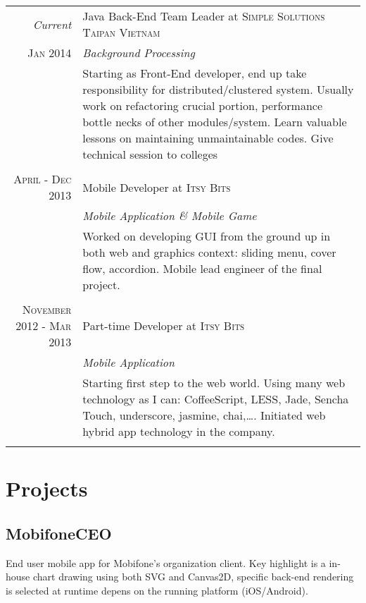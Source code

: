 \documentclass[a4paper,10pt]{article}
\begin{document}
\begin{tabular}{r|p{11cm}}

    \emph{Current} & Java Back-End Team Leader at \textsc{Simple Solutions Taipan Vietnam} \\\textsc{Jan 2014}&\emph{Background Processing}\\&\footnotesize{Starting as Front-End developer, end up take responsibility for distributed/clustered system. Usually work on refactoring crucial portion, performance bottle necks of other modules/system. Learn valuable lessons on maintaining unmaintainable codes. Give technical session to colleges}\\\multicolumn{2}{c}{} \\

    \textsc{April - Dec 2013 } & Mobile Developer at \textsc{Itsy Bits} \\&\emph{Mobile Application \& Mobile Game}\\&\footnotesize{Worked on developing GUI from the ground up in both web and graphics context: sliding menu, cover flow, accordion. Mobile lead engineer of the final project.}\\\multicolumn{2}{c}{} \\

    \textsc{November 2012 - Mar 2013} & Part-time Developer at \textsc{Itsy Bits} \\&\emph{Mobile Application}\\&\footnotesize{
    Starting first step to the web world. Using many web technology as I can: CoffeeScript, LESS, Jade, Sencha Touch, underscore, jasmine, chai,\ldots. Initiated web hybrid app technology in the company.}\\\multicolumn{2}{c}{} \\

\end{tabular}

\section{Projects}

\subsection*{MobifoneCEO}

End user mobile app for Mobifone's organization client. Key highlight is a in-house chart drawing using both SVG and Canvas2D, specific back-end rendering is selected at runtime depens on the running platform (iOS/Android).
\end{document}
